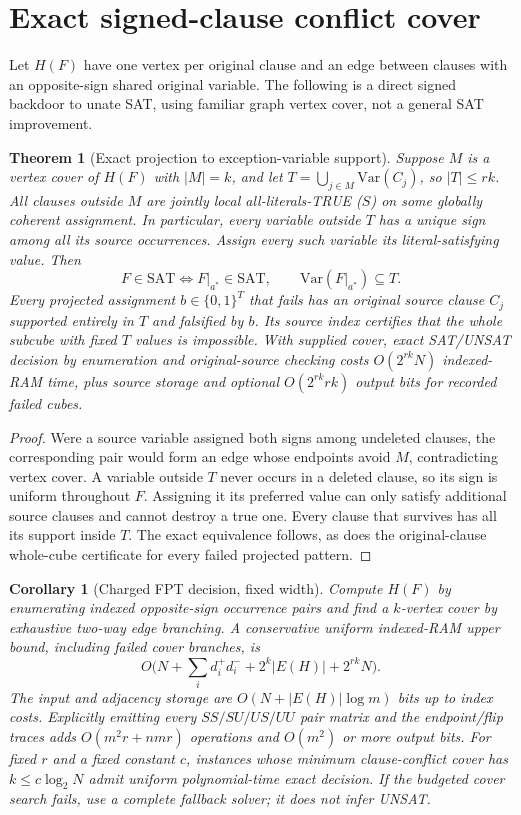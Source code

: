 \documentclass[10pt]{article}
\newtheorem{theorem}{Theorem}
\newtheorem{corollary}{Corollary}
\begin{document}
\section{Exact signed-clause conflict cover}
Let $H(F)$ have one vertex per original clause and an edge between clauses with an opposite-sign shared original variable. The following is a direct signed backdoor to unate SAT, using familiar graph vertex cover, not a general SAT improvement.
\begin{theorem}[Exact projection to exception-variable support]
Suppose $M$ is a vertex cover of $H(F)$ with $|M|=k$, and let $T=\bigcup_{j\in M}\mathrm{Var}(C_j)$, so $|T|\le rk$. All clauses outside $M$ are jointly local all-literals-TRUE ($S$) on some globally coherent assignment. In particular, every variable outside $T$ has a unique sign among all its source occurrences. Assign every such variable its literal-satisfying value. Then
\[
 F\in\mathrm{SAT}\iff F|_{a^*}\in\mathrm{SAT},\qquad
 \mathrm{Var}(F|_{a^*})\subseteq T.
\]
Every projected assignment $b\in\{0,1\}^T$ that fails has an original source clause $C_j$ supported entirely in $T$ and falsified by $b$. Its source index certifies that the whole subcube with fixed $T$ values is impossible. With supplied cover, exact SAT/UNSAT decision by enumeration and original-source checking costs $O(2^{rk}N)$ indexed-RAM time, plus source storage and optional $O(2^{rk}rk)$ output bits for recorded failed cubes.
\end{theorem}
\begin{proof}
Were a source variable assigned both signs among undeleted clauses, the corresponding pair would form an edge whose endpoints avoid $M$, contradicting vertex cover. A variable outside $T$ never occurs in a deleted clause, so its sign is uniform throughout $F$. Assigning it its preferred value can only satisfy additional source clauses and cannot destroy a true one. Every clause that survives has all its support inside $T$. The exact equivalence follows, as does the original-clause whole-cube certificate for every failed projected pattern.
\end{proof}
\begin{corollary}[Charged FPT decision, fixed width]
Compute $H(F)$ by enumerating indexed opposite-sign occurrence pairs and find a $k$-vertex cover by exhaustive two-way edge branching. A conservative uniform indexed-RAM upper bound, including failed cover branches, is
\[
 O\bigl(N+\sum_i d_i^+d_i^-+2^k|E(H)|+2^{rk}N\bigr).
\]
The input and adjacency storage are $O(N+|E(H)|\log m)$ bits up to index costs. Explicitly emitting every $SS/SU/US/UU$ pair matrix and the endpoint/flip traces adds $O(m^2r+nmr)$ operations and $O(m^2)$ or more output bits. For fixed $r$ and a fixed constant $c$, instances whose minimum clause-conflict cover has $k\le c\log_2N$ admit uniform polynomial-time exact decision. If the budgeted cover search fails, use a complete fallback solver; it does not infer UNSAT.
\end{corollary}
\end{document}
